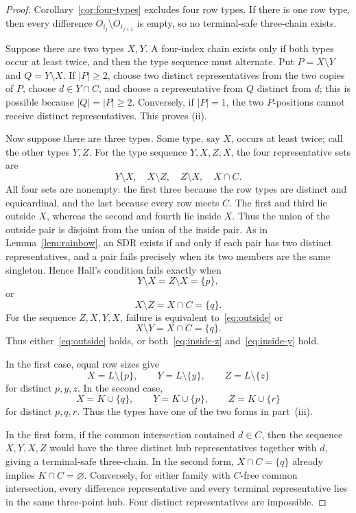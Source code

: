 \documentclass[11pt]{amsart}
\theoremstyle{definition}
\begin{document}
\begin{proof}
Corollary~\ref{cor:four-types} excludes four row types.  If there is one
row type, then every difference
$O_{i_j}\setminus O_{i_{j+1}}$ is empty, so no terminal-safe
three-chain exists.

Suppose there are two types $X,Y$.  A four-index chain exists only if both types occur at least twice, and then the type sequence must alternate.  Put $P=X\setminus Y$ and $Q=Y\setminus X$.  If $|P|\ge2$, choose two distinct representatives from the two copies of $P$, choose $d\in Y\cap C$, and choose a representative from $Q$ distinct from $d$; this is possible because $|Q|=|P|\ge2$.  Conversely, if $|P|=1$, the two $P$-positions cannot receive distinct representatives.  This proves (ii).

Now suppose there are three types.  Some type, say $X$, occurs at least twice; call the other types $Y,Z$.  For the type sequence $Y,X,Z,X$, the four representative sets are
\[
  Y\setminus X,\quad X\setminus Z,\quad Z\setminus X,\quad X\cap C.
\]
All four sets are nonempty: the first three because the row types are
distinct and equicardinal, and the last because every row meets $C$.
The first and third lie outside $X$, whereas the second and fourth lie
inside $X$.  Thus the union of the outside pair is disjoint from the
union of the inside pair.  As in Lemma~\ref{lem:rainbow}, an SDR exists
if and only if each pair has two distinct representatives, and a pair
fails precisely when its two members are the same singleton.  Hence
Hall's condition fails exactly when
\begin{equation}\label{eq:outside}
  Y\setminus X=Z\setminus X=\{p\},
\end{equation}
or
\begin{equation}\label{eq:inside-z}
  X\setminus Z=X\cap C=\{q\}.
\end{equation}
For the sequence $Z,X,Y,X$, failure is equivalent to~\eqref{eq:outside} or
\begin{equation}\label{eq:inside-y}
  X\setminus Y=X\cap C=\{q\}.
\end{equation}
Thus either~\eqref{eq:outside} holds, or both~\eqref{eq:inside-z} and~\eqref{eq:inside-y} hold.

In the first case, equal row sizes give
\[
  X=L\setminus\{p\},\qquad Y=L\setminus\{y\},\qquad Z=L\setminus\{z\}
\]
for distinct $p,y,z$.  In the second case,
\[
  X=K\cup\{q\},\qquad Y=K\cup\{p\},\qquad Z=K\cup\{r\}
\]
for distinct $p,q,r$.  Thus the types have one of the two forms in
part~(iii).

In the first form, if the common intersection contained $d\in C$, then
the sequence $X,Y,X,Z$ would have the three distinct hub
representatives together with $d$, giving a terminal-safe three-chain.
In the second form, $X\cap C=\{q\}$ already implies
$K\cap C=\varnothing$.  Conversely, for either family with $C$-free
common intersection, every difference representative and every
terminal representative lies in the same three-point hub.  Four
distinct representatives are impossible.
\end{proof}
\end{document}
